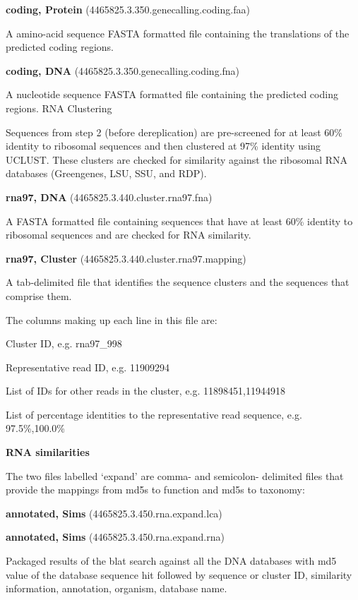 \documentclass[12pt,fullpage]{report}
\begin{document}
{\begin{mdframed}
\par
\textbf{coding, Protein} (4465825.3.350.genecalling.coding.faa)
\par
A amino-acid sequence FASTA formatted file containing the translations of the predicted coding regions.
\par
\textbf{coding, DNA} (4465825.3.350.genecalling.coding.fna)
\par
A nucleotide sequence FASTA formatted file containing the predicted coding regions.
RNA Clustering
\par
Sequences from step 2 (before dereplication) are pre-screened for at least 60\% identity to ribosomal sequences and then clustered at 97\% identity using UCLUST. These clusters are checked for similarity against the ribosomal RNA databases (Greengenes, LSU, SSU, and RDP).
\par
\textbf{rna97, DNA} (4465825.3.440.cluster.rna97.fna)
\par
A FASTA formatted file containing sequences that have at least 60\% identity to ribosomal sequences and are checked for RNA similarity.
\par
\textbf{rna97, Cluster} (4465825.3.440.cluster.rna97.mapping)
\par
A tab-delimited file that identifies the sequence clusters and the sequences that comprise them.
\par
The columns making up each line in this file are:
\par
Cluster ID, e.g. rna97\_998
\par
Representative read ID, e.g. 11909294
\par
List of IDs for other reads in the cluster, e.g. 11898451,11944918
\par
List of percentage identities to the representative read sequence, e.g. 97.5\%,100.0\%
\par
\textbf{RNA similarities}
\par
The two files labelled ‘expand’ are comma- and semicolon- delimited files that provide the mappings from md5s to function and md5s to taxonomy:
\par
\textbf{annotated, Sims} (4465825.3.450.rna.expand.lca)
\par
\textbf{annotated, Sims} (4465825.3.450.rna.expand.rna)
\par
Packaged results of the blat search against all the DNA databases with md5 value of the database sequence hit followed by sequence or cluster ID, similarity information, annotation, organism, database name.
\par

\end{mdframed}}
\end{document}
